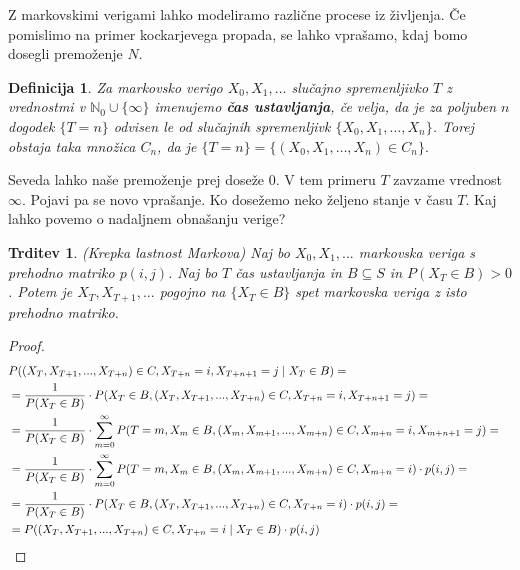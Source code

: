 \documentclass[a4paper,12pt]{article}
\newtheorem{trditev}[izrek]{Trditev}
\newtheorem{definicija}[izrek]{Definicija}
\begin{document}
Z markovskimi verigami lahko modeliramo različne procese iz življenja. Če pomislimo na primer kockarjevega propada, 
se lahko vprašamo, kdaj bomo dosegli premoženje $N$.

\begin{definicija}
    Za markovsko verigo $X_0, X_1, ...$ slučajno spremenljivko $T$ z vrednostmi v $ \mathbb{N}_0 \cup \{\infty \}$ 
    imenujemo \textbf{čas ustavljanja}, če velja, da je za poljuben 
    $n$ dogodek $\{T = n\}$ odvisen le od slučajnih spremenljivk $\{X_0, X_1, . . . , X_n\}$. 
    Torej obstaja taka množica $C_n$, da je $\{T = n\} = \{(X_0, X_1, …, X_n) \in C_n\}.$
\end{definicija}

Seveda lahko naše premoženje prej doseže 0. V tem primeru $T$ zavzame vrednost $\infty$. Pojavi pa se novo vprašanje. Ko dosežemo 
neko željeno stanje v času $T$. Kaj lahko povemo o nadaljnem obnašanju verige?

\begin{trditev}
    (Krepka lastnost Markova)
    Naj bo $X_0, X_1, ...$ markovska veriga s prehodno matriko $p{(i,j)}$. Naj bo $T$ čas ustavljanja in $B \subseteq S$ in $P(X_T \in B)>0$. Potem je $X_T, X_{T+1}, ...$ pogojno na 
    $\{X_T \in B\}$ spet markovska veriga z isto prehodno matriko.
\end{trditev}

\begin{proof}
    \begin{align*}
        \lefteqn{P((X_T, X_{T+1}, ..., X_{T+n}) \in C, \space X_{T+n}=i, \space X_{T+n+1}=j \mid X_T \in B)=} 
        \\&= \frac{1}{P(X_T \in B)} \cdot P(X_T \in B, \space (X_T, X_{T+1}, ..., X_{T+n})\in C, \space X_{T+n}=i, \space X_{T+n+1}=j)=
        \\&= \frac{1}{P(X_T \in B)} \cdot \displaystyle\sum_{m=0}^{\infty} P(T=m, \space X_m \in B, \space (X_m, X_{m+1}, ..., X_{m+n}) \in C, \space X_{m+n}=i, \space X_{m+n+1}=j)=
        \\&= \frac{1}{P(X_T \in B)} \cdot \displaystyle\sum_{m=0}^{\infty} P(T=m, \space X_m \in B, \space (X_m, X_{m+1}, ..., X_{m+n}) \in C, \space X_{m+n}=i) \cdot p{(i,j)}=
        \\&= \frac{1}{P(X_T \in B)} \cdot P(X_T \in B, \space (X_T, X_{T+1}, ..., X_{T+n})\in C, \space X_{T+n}=i) \cdot p{(i,j)} =
        \\&=P((X_T, X_{T+1}, ..., X_{T+n}) \in C, \space X_{T+n}=i \mid X_T \in B) \cdot p{(i,j)}
    \end{align*}
\end{proof}
\end{document}
